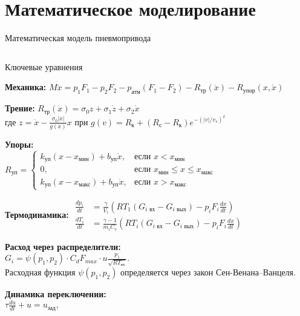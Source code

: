 \section{Математическое моделирование}


\begin{frame}{Математическая модель пневмопривода}
	\begin{columns}
		\begin{column}{0.6\textwidth}
			\vspace{-0.6cm}
			\begin{block}{\small Ключевые уравнения}
				\scriptsize
				\begin{compactitem}
					\item \textbf{Механика:}
					$
						M\ddot{x} = p_1F_1 - p_2F_2 - p_\text{атм}(F_1 - F_2) - R_\text{тр}(\dot{x}) - R_\text{упор}(x,\dot{x})
					$
					\item \textbf{Трение:}
					$
						R_\text{тр}(\dot{x}) = \sigma_0z + \sigma_1\dot{z} + \sigma_2\dot{x}
					$\\
					где $z = \dot{x} - \frac{\sigma_0|\dot{x}|}{g(\dot{x})}x$ при
					$g(v) = R_\text{к} + (R_\text{с} - R_\text{к})e^{-(|v|/v_s)^\delta}$
					\item \textbf{Упоры:\\}
					$
						R_\text{уп} = \begin{cases}
							k_\text{уп}(x - x_\text{мин}) + b_\text{уп}\dot{x},  & \text{если } x < x_\text{мин}                       \\
							0,                                                   & \text{если } x_\text{мин} \leq x \leq x_\text{макс} \\
							k_\text{уп}(x - x_\text{макс}) + b_\text{уп}\dot{x}, & \text{если } x > x_\text{макс}
						\end{cases}
					$
					\item \textbf{Термодинамика:}
					$
						\begin{aligned}
							\frac{dp_i}{dt} & = \frac{\gamma}{V_i}\left(RT_1(G_{i\text{ вх}} - G_{i\text{ вых}}) - p_i F_i\frac{dx}{dt}\right)     \\
							\frac{dT_i}{dt} & = \frac{\gamma-1}{m_iC_v}\left(RT_i(G_{i\text{ вх}} - G_{i\text{ вых}}) - p_iF_i\frac{dx}{dt}\right)
						\end{aligned}
					$
					\item \textbf{Расход через распределители:\\}
					$
						G_i = \psi(p_1, p_2) \cdot C_d F_{max} \cdot u \frac{p_1}{\sqrt{RT_\text{вх}}}.
					$\\
					Расходная функция $\psi(p_1, p_2)$ определяется через закон Сен-Венана--Ванцеля.
					\item \textbf{Динамика переключении:\\}
					$
						\tau \frac{du}{dt} + u = u_{\text{зад}},
					$


\end{compactitem}
\end{block}
\end{column}
\end{columns}
\end{frame}
